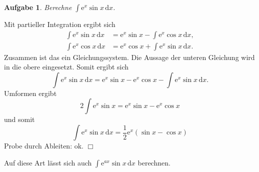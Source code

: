 \documentclass[a4paper,10pt,fleqn,twoside]{scrartcl}
\numberwithin{equation}{section}
\newcommand{\ee}{\mathrm e}
\newcommand{\strong}[1]{{\sf\bfseries #1}}
\theoremstyle{Aufgabe}
\newtheorem{Aufgabe}{\sffamily Aufgabe}[section]
\begin{document}
\begin{Aufgabe}
Berechne $\displaystyle\int\ee^x\sin x\,\mathrm dx$.
\end{Aufgabe}

\noindent\strong{Lösung.}
Mit partieller Integration ergibt sich
\begin{align}
\int \ee^x\sin x\,\mathrm dx &= \ee^x\sin x - \int \ee^x\cos x\,\mathrm dx,\\
\int \ee^x\cos x\,\mathrm dx &= \ee^x\cos x + \int \ee^x\sin x\,\mathrm dx.
\end{align}
Zusammen ist das ein Gleichungssystem. Die Aussage der unteren
Gleichung wird in die obere eingesetzt. Somit ergibt sich
\begin{equation}
\int \ee^x\sin x\,\mathrm dx = \ee^x\sin x - \ee^x\cos x - \int \ee^x\sin x\,\mathrm dx.
\end{equation}
Umformen ergibt
\begin{equation}
2\int \ee^x\sin x = \ee^x\sin x-\ee^x\cos x
\end{equation}
und somit
\begin{equation}
\int \ee^x\sin x\,\mathrm dx = \frac{1}{2}\ee^x(\sin x-\cos x)
\end{equation}
Probe durch Ableiten: ok. $\Box$

Auf diese Art lässt sich auch $\displaystyle\int \ee^{ax}\sin x\,\mathrm dx$
berechnen.
\end{document}
